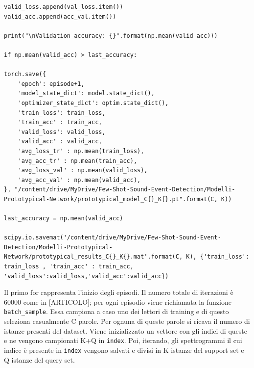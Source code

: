 \documentclass[12pt,a4paper,titlepage]{article}
\begin{document}
\begin{lstlisting}[language=iPython,firstnumber=1, caption=words\_per\_reader.py, label=words_per_reader,captionpos=b]
valid_loss.append(val_loss.item())
valid_acc.append(acc_val.item())

print("\nValidation accuracy: {}".format(np.mean(valid_acc)))

if np.mean(valid_acc) > last_accuracy: 

torch.save({
	'epoch': episode+1,
	'model_state_dict': model.state_dict(),
	'optimizer_state_dict': optim.state_dict(),
	'train_loss': train_loss,
	'train_acc' : train_acc,              
	'valid_loss': valid_loss,
	'valid_acc' : valid_acc,
	'avg_loss_tr' : np.mean(train_loss),
	'avg_acc_tr' : np.mean(train_acc),
	'avg_loss_val' : np.mean(valid_loss),
	'avg_acc_val' : np.mean(valid_acc),
}, "/content/drive/MyDrive/Few-Shot-Sound-Event-Detection/Modelli-Prototypical-Network/prototypical_model_C{}_K{}.pt".format(C, K))

last_accuracy = np.mean(valid_acc)

scipy.io.savemat('/content/drive/MyDrive/Few-Shot-Sound-Event-Detection/Modelli-Prototypical-Network/prototypical_results_C{}_K{}.mat'.format(C, K), {'train_loss': train_loss , 'train_acc' : train_acc, 'valid_loss':valid_loss,'valid_acc':valid_acc})
\end{lstlisting}
Il primo for rappresenta l'inizio degli episodi.
Il numero totale di iterazioni è 60000 come in [ARTICOLO]; per ogni episodio viene richiamata la funzione \texttt{batch\_sample}.
Essa campiona a caso uno dei lettori di training e di questo seleziona casualmente C parole.
Per ognuna di queste parole si ricava il numero di istanze presenti del dataset.
Viene inizializzato un vettore con gli indici di queste e ne vengono campionati K+Q in \texttt{index}. Poi, iterando, gli spettrogrammi il cui indice è presente in \texttt{index} vengono salvati e divisi in K istanze del support set e Q istanze del query set.
\end{document}
